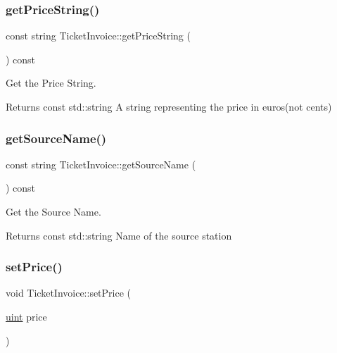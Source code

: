 \subsubsection{\texorpdfstring{get\+Price\+String()}{getPriceString()}}
{\footnotesize\ttfamily const string Ticket\+Invoice\+::get\+Price\+String (\begin{DoxyParamCaption}{ }\end{DoxyParamCaption}) const}



Get the Price String. 

\begin{DoxyReturn}{Returns}
const std\+::string A string representing the price in euros(not cents) 
\end{DoxyReturn}
\mbox{\label{classTicketInvoice_ad692197170d5cb11790dff71150ef891}} 
\subsubsection{\texorpdfstring{get\+Source\+Name()}{getSourceName()}}
{\footnotesize\ttfamily const string Ticket\+Invoice\+::get\+Source\+Name (\begin{DoxyParamCaption}{ }\end{DoxyParamCaption}) const}



Get the Source Name. 

\begin{DoxyReturn}{Returns}
const std\+::string Name of the source station 
\end{DoxyReturn}
\mbox{\label{classTicketInvoice_afeed9962f0276861876a001e372d2063}} 
\subsubsection{\texorpdfstring{set\+Price()}{setPrice()}}
{\footnotesize\ttfamily void Ticket\+Invoice\+::set\+Price (\begin{DoxyParamCaption}\item[{\mbox{\hyperlink{project__utils_8h_a91ad9478d81a7aaf2593e8d9c3d06a14}{uint}}}]{price }\end{DoxyParamCaption})}



